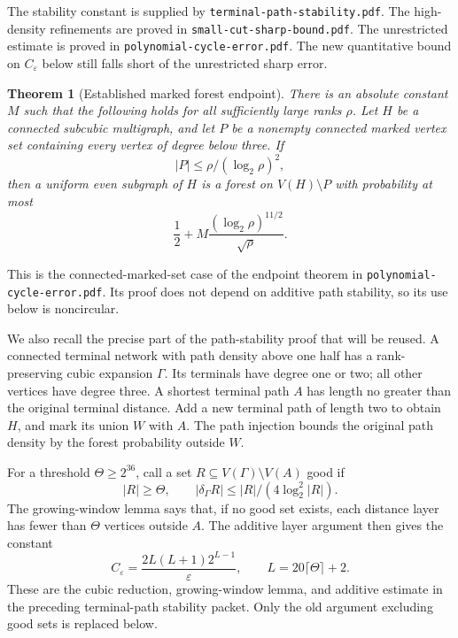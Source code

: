 \documentclass[11pt]{article}
\newtheorem{theorem}{Theorem}[section]
\begin{document}
The stability constant is supplied by \nolinkurl{terminal-path-stability.pdf}.
The high-density refinements are proved in \nolinkurl{small-cut-sharp-bound.pdf}.
The unrestricted estimate is proved in \nolinkurl{polynomial-cycle-error.pdf}.
The new quantitative bound on $C_\varepsilon$ below still falls short of the unrestricted sharp error.

\begin{theorem}[Established marked forest endpoint]
\label{thm:parallel-links-log-five-half-forest}
There is an absolute constant $M$ such that the following holds for all sufficiently large ranks $\rho$.
Let $H$ be a connected subcubic multigraph, and let $P$ be a nonempty connected marked vertex set containing every vertex of degree below three.
If
\[
 |P|\le\rho/(\log_2\rho)^2,
\]
then a uniform even subgraph of $H$ is a forest on $V(H)\setminus P$ with probability at most
\[
 \frac12+M\frac{(\log_2\rho)^{11/2}}{\sqrt\rho}.
\]
\end{theorem}

This is the connected-marked-set case of the endpoint theorem in \nolinkurl{polynomial-cycle-error.pdf}.
Its proof does not depend on additive path stability, so its use below is noncircular.

We also recall the precise part of the path-stability proof that will be reused.
A connected terminal network with path density above one half has a rank-preserving cubic expansion $\Gamma$.
Its terminals have degree one or two; all other vertices have degree three.
A shortest terminal path $A$ has length no greater than the original terminal distance.
Add a new terminal path of length two to obtain $H$, and mark its union $W$ with $A$.
The path injection bounds the original path density by the forest probability outside $W$.

For a threshold $\Theta\ge2^{36}$, call a set $R\subseteq V(\Gamma)\setminus V(A)$ good if
\[
 |R|\ge\Theta,\qquad |\delta_\Gamma R|\le |R|/(4\log_2^2|R|).
\]
The growing-window lemma says that, if no good set exists, each distance layer has fewer than $\Theta$ vertices outside $A$.
The additive layer argument then gives the constant
\[
 C_\varepsilon=\frac{2L(L+1)2^{L-1}}{\varepsilon},
 \qquad L=20\lceil\Theta\rceil+2.
\]
These are the cubic reduction, growing-window lemma, and additive estimate in the preceding terminal-path stability packet.
Only the old argument excluding good sets is replaced below.













\end{document}
